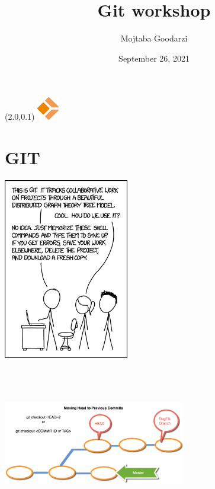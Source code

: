 \documentclass[11pt,xcolor={dvipsnames}]{beamer} %
\title[Git workshop]{Git workshop}
\author[Mojtaba Goodarzi]
{Mojtaba Goodarzi}
\institute[Sepehr]
{
  Sepehr
  }
\date{September 26, 2021}
\newcommand{\MyLogo}{%
\begin{textblock}{14}(2.0,0.1)
 \includegraphics[height=1cm, angle=0]{logo}
\end{textblock}
}
\begin{document}

\begin{frame}
	\MyLogo
	\begin{center}
		\titlepage
	\end{center}
\end{frame}




\section{GIT}

\begin{frame}

	\includegraphics[height=300px]{why-git.png}
\end{frame}

\begin{frame}
	\includegraphics[height=250px,width=300px]{git-checkout.png}
\end{frame}
\end{document}

